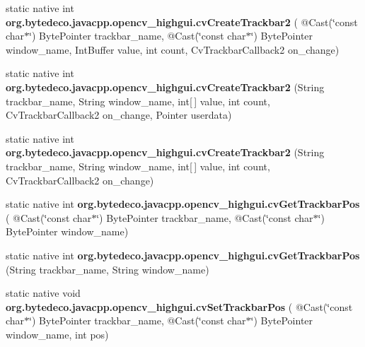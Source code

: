 \begin{DoxyCompactItemize}
\item 
\mbox{\label{group__highgui__c_ga0838df9185a063f473806134dcd8209f}} 
static native int {\bfseries org.\+bytedeco.\+javacpp.\+opencv\+\_\+highgui.\+cv\+Create\+Trackbar2} ( @Cast(\char`\"{}const char$\ast$\char`\"{}) Byte\+Pointer trackbar\+\_\+name, @Cast(\char`\"{}const char$\ast$\char`\"{}) Byte\+Pointer window\+\_\+name, Int\+Buffer value, int count, Cv\+Trackbar\+Callback2 on\+\_\+change)
\item 
\mbox{\label{group__highgui__c_ga0089ba0a98f134cf2f623dfc9b873b83}} 
static native int {\bfseries org.\+bytedeco.\+javacpp.\+opencv\+\_\+highgui.\+cv\+Create\+Trackbar2} (String trackbar\+\_\+name, String window\+\_\+name, int\mbox{[}$\,$\mbox{]} value, int count, Cv\+Trackbar\+Callback2 on\+\_\+change, Pointer userdata)
\item 
\mbox{\label{group__highgui__c_gafaea15d84cd59a649e59a7e4ada317f8}} 
static native int {\bfseries org.\+bytedeco.\+javacpp.\+opencv\+\_\+highgui.\+cv\+Create\+Trackbar2} (String trackbar\+\_\+name, String window\+\_\+name, int\mbox{[}$\,$\mbox{]} value, int count, Cv\+Trackbar\+Callback2 on\+\_\+change)
\item 
\mbox{\label{group__highgui__c_gac3bd2d2ce9519b2a84e99ea7abb7dbf1}} 
static native int {\bfseries org.\+bytedeco.\+javacpp.\+opencv\+\_\+highgui.\+cv\+Get\+Trackbar\+Pos} ( @Cast(\char`\"{}const char$\ast$\char`\"{}) Byte\+Pointer trackbar\+\_\+name, @Cast(\char`\"{}const char$\ast$\char`\"{}) Byte\+Pointer window\+\_\+name)
\item 
\mbox{\label{group__highgui__c_gaa56b5b7accc9a2eb564935a1d9f9ff36}} 
static native int {\bfseries org.\+bytedeco.\+javacpp.\+opencv\+\_\+highgui.\+cv\+Get\+Trackbar\+Pos} (String trackbar\+\_\+name, String window\+\_\+name)
\item 
\mbox{\label{group__highgui__c_gaf3557bbdc4f044a3a832084b607d2c94}} 
static native void {\bfseries org.\+bytedeco.\+javacpp.\+opencv\+\_\+highgui.\+cv\+Set\+Trackbar\+Pos} ( @Cast(\char`\"{}const char$\ast$\char`\"{}) Byte\+Pointer trackbar\+\_\+name, @Cast(\char`\"{}const char$\ast$\char`\"{}) Byte\+Pointer window\+\_\+name, int pos)
\item 

\end{DoxyCompactItemize}
